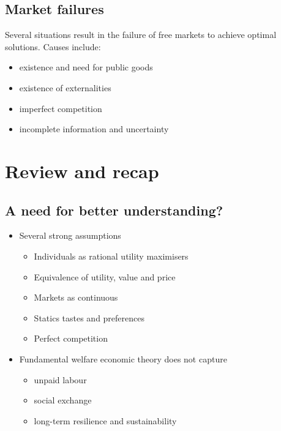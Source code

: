 \documentclass[class=report, crop=false, 12pt,a4paper]{standalone}
\begin{document}
\subsection{Market failures}
Several situations result in the failure of free markets to achieve optimal solutions. Causes include:
\begin{itemize}
	\item existence and need for public goods
	\item existence of externalities
	\item imperfect competition
	\item incomplete information and uncertainty
\end{itemize}
\section{Review and recap}
\subsection{A need for better understanding?}
\begin{itemize}
	\item Several strong assumptions
	      \begin{itemize}
		      \item Individuals as rational utility maximisers
		      \item Equivalence of utility, value and price
		      \item Markets as continuous
		      \item Statics tastes and preferences
		      \item Perfect competition
	      \end{itemize}
	\item Fundamental welfare economic theory does not capture
	      \begin{itemize}
		      \item unpaid labour
		      \item social exchange
		      \item long-term resilience and sustainability
	      \end{itemize}
\end{itemize}
\end{document}
